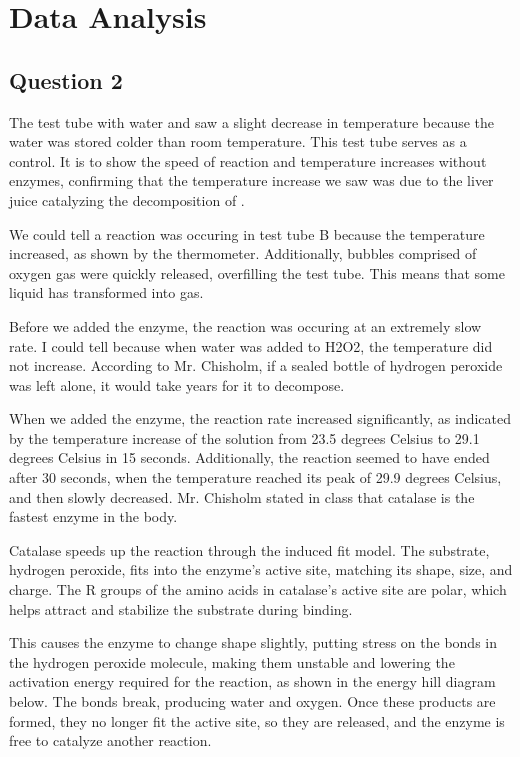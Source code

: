 \documentclass[12pt]{article}
\begin{document}
\section*{Data Analysis}

\subsection*{Question 2}
\begin{enumAlph}
    \item The test tube with water and  saw a slight decrease in temperature
    because the water was stored colder than room temperature. This test tube serves as a control. It is to show
    the speed of reaction and temperature increases without enzymes, 
    confirming that the temperature increase we saw
    was due to the liver juice catalyzing the decomposition of . 
    \item We could tell a reaction was occuring in test tube B 
    because the temperature increased, as shown by the thermometer.
    Additionally, bubbles comprised of oxygen gas were quickly released, overfilling
    the test tube. This means that some liquid has transformed into gas. 
    \item Before we added the enzyme, the reaction was occuring at 
    an extremely slow rate. I could tell because when water was added to H2O2, 
    the temperature did not increase. According to Mr. 
    Chisholm, if a sealed bottle of hydrogen peroxide was left alone,
    it would take years for it to decompose.
    \item When we added the enzyme, the
    reaction rate increased significantly, as indicated by the temperature increase of the solution from 
    23.5 degrees Celsius to 29.1 degrees Celsius in 15 seconds. Additionally, the reaction seemed to have
    ended after 30 seconds, when the temperature reached its peak of 29.9 degrees Celsius, and then
    slowly decreased. Mr. Chisholm stated in class that catalase is the fastest
    enzyme in the body. 
    \item Catalase speeds up the reaction through the induced fit model. 
    The substrate, hydrogen peroxide, fits into the enzyme's active site, 
    matching its shape, size, and charge. The R groups of the amino acids in catalase’s active site are polar, which helps attract and stabilize the substrate during binding.
    
    This causes the enzyme to change 
    shape slightly, putting stress on the bonds in the hydrogen peroxide 
    molecule, making them unstable and lowering the activation energy 
    required for the reaction, as shown in the energy hill diagram below. The bonds break, producing water and oxygen. 
    Once these products are formed, they no longer fit the active site, 
    so they are released, and the enzyme is free to catalyze another reaction.


\end{enumAlph}
\end{document}
